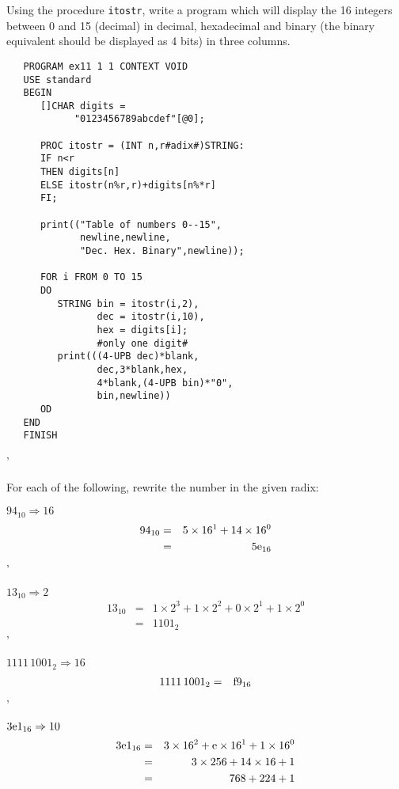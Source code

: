 \begin{exercise}
\item Using the procedure \verb|itostr|, write a program which will
display the 16 integers between 0 and 15 (decimal) in decimal,
hexadecimal and binary (the binary equivalent should be displayed as 4
bits) in three columns. \ans \begin{verbatim}
   PROGRAM ex11 1 1 CONTEXT VOID
   USE standard
   BEGIN
      []CHAR digits =
            "0123456789abcdef"[@0];

      PROC itostr = (INT n,r#adix#)STRING:
      IF n<r
      THEN digits[n]
      ELSE itostr(n%r,r)+digits[n%*r]
      FI;

      print(("Table of numbers 0--15",
             newline,newline,
             "Dec. Hex. Binary",newline));

      FOR i FROM 0 TO 15
      DO
         STRING bin = itostr(i,2),
                dec = itostr(i,10),
                hex = digits[i];
                #only one digit#
         print(((4-UPB dec)*blank,
                dec,3*blank,hex,
                4*blank,(4-UPB bin)*"0",
                bin,newline))
      OD
   END
   FINISH
\end{verbatim}
'
\item For each of the following, rewrite the number in the given radix:
\begin{subex}
\item $94_{10}\Rightarrow16$ \subans \begin{eqnarray*}
94_{10}&=&5\times16^1+14\times16^0\\
       &=&5\hbox{e}_{16}
\end{eqnarray*}
'
\item $13_{10}\Rightarrow2$ \subans \begin{eqnarray*}
13_{10}&=&1\times2^3+1\times2^2+0\times2^1+1\times2^0\\
       &=&1101_2
\end{eqnarray*}
'
\item $1111\,1001_2\Rightarrow16$ \subans \begin{eqnarray*}
1111\,1001_2&=&\hbox{f}9_{16}
\end{eqnarray*}
'
\item $3\hbox{e}1_{16}\Rightarrow 10$ \subans \begin{eqnarray*}
3\hbox{e}1_{16}&=&3\times16^2+\hbox{e}\times16^1+1\times16^0\\
               &=&3\times256+14\times16+1\\
               &=&768+224+1\\

\end{eqnarray*}
\end{subex}
\end{exercise}
